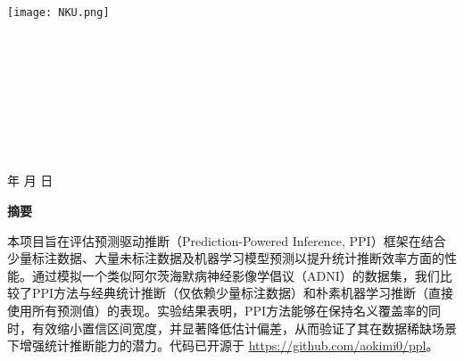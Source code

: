 \documentclass[12pt,a4paper]{article}
\begin{document}
\renewcommand{\contentsname}{目录}
\renewcommand{\appendixname}{附录}
\renewcommand{\appendixpagename}{附录}
\renewcommand{\refname}{参考文献} 
\renewcommand{\figurename}{图}
\renewcommand{\tablename}{表}
\renewcommand{\abstractname}{摘要}
\renewcommand{\today}{\number\year 年 \number\month 月 \number\day 日}

\renewcommand {\thefigure}{\thesection{}.\arabic{figure}}%
\renewcommand{\figurename}{图}
\renewcommand{\contentsname}{目录}  

\begin{titlepage}
    \begin{center}
    \texttt{[image: NKU.png]}\\[1cm]
    \vspace{20mm}
		\textbf{\huge\textbf{}}\\[0.5cm]
		\textbf{\huge{}}\\[2.3cm]

		\vspace{\fill}
    
    \centering
    \textsc{\LARGE {}}\\[0.5cm]
    \textsc{\LARGE {}}\\[0.5cm]
    \textsc{\LARGE {}}\\[0.5cm]
    \textsc{\LARGE {}}\\[0.5cm]
    \textsc{\LARGE {}}\\[0.5cm]
    \textsc{\LARGE {}}\\[0.5cm]
    \vfill
    {\Large \today}
    \end{center}
\end{titlepage}

\clearpage
{} %
\begin{center}
    {\songti\bfseries 摘\quad 要}
\end{center}
\vspace{0.5em}
\small
\setlength{\parindent}{2em} %

\indent 本项目旨在评估预测驱动推断（Prediction-Powered Inference, PPI）框架在结合少量标注数据、大量未标注数据及机器学习模型预测以提升统计推断效率方面的性能。通过模拟一个类似阿尔茨海默病神经影像学倡议（ADNI）的数据集，我们比较了PPI方法与经典统计推断（仅依赖少量标注数据）和朴素机器学习推断（直接使用所有预测值）的表现。实验结果表明，PPI方法能够在保持名义覆盖率的同时，有效缩小置信区间宽度，并显著降低估计偏差，从而验证了其在数据稀缺场景下增强统计推断能力的潜力。代码已开源于 \url{https://github.com/aokimi0/ppl}。
\end{document}
